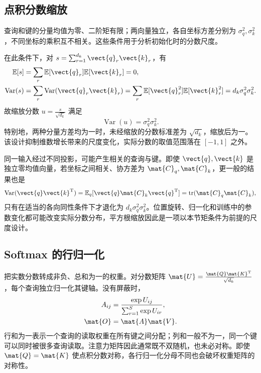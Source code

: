 \documentclass[../textbook.tex]{subfiles}
\begin{document}
\subsection{点积分数缩放}
\begin{assumption}[平方根缩放的矩条件]
查询和键的分量均值为零、二阶矩有限；两向量独立，各自坐标方差分别为 $\sigma_q^2,\sigma_k^2$，不同坐标的乘积互不相关。这些条件用于分析初始化时的分数尺度。
\end{assumption}
在此条件下，对 $s=\sum_{r=1}^{d_k}\vect{q}_r\vect{k}_r$，有
\begin{align}
 \mathbb E[s]&=\sum_r\mathbb E[\vect{q}_r]\mathbb E[\vect{k}_r]=0,\\
 \operatorname{Var}(s)
 &=\sum_r\operatorname{Var}(\vect{q}_r\vect{k}_r)
 =\sum_r\mathbb E[\vect{q}_r^2]\mathbb E[\vect{k}_r^2]
 =d_k\sigma_q^2\sigma_k^2.
\end{align}
故缩放分数 $u=\frac{s}{\sqrt{d_k}}$ 满足
\begin{equation}
 \operatorname{Var}(u)=\sigma_q^2\sigma_k^2.\label{eq:attn-scale}
\end{equation}
特别地，两种分量方差均为一时，未经缩放的分数标准差为 $\sqrt{d_k}$，缩放后为一。该设计抑制维数增长带来的尺度变化，实际分数的取值范围落在 $[-1,1]$ 之外。

同一输入经过不同投影，可能产生相关的查询与键。即使 $\vect{q},\vect{k}$ 是独立零均值向量，若坐标之间相关、协方差为 $\mat{C}_q,\mat{C}_k$，更一般的结果也是
\begin{equation}
 \operatorname{Var}(\vect{q}\vect{k}^{\mathrm{T}})
 =\mathbb E_q[\vect{q}\mat{C}_k\vect{q}^{\mathrm{T}}]
 =\operatorname{tr}(\mat{C}_q\mat{C}_k),
\end{equation}
只有在适当的各向同性条件下才退化为 $d_k\sigma_q^2\sigma_k^2$。位置旋转、归一化和训练中的参数变化都可能改变实际分数分布，平方根缩放因此是一项以本节矩条件为前提的尺度设计。

\subsection{Softmax 的行归一化}
把实数分数转成非负、总和为一的权重。对分数矩阵 $\mat{U}=\frac{\mat{Q}\mat{K}^{\mathrm{T}}}{\sqrt{d_k}}$，每个查询独立归一化其键轴。没有屏蔽时，
\begin{equation}\label{eq:attn-basic}
 \begin{aligned}
  A_{ij}&=\frac{\exp U_{ij}}{\sum_{r=1}^{S}\exp U_{ir}},\\
  \mat{O}&=\mat{A}\mat{V}.
 \end{aligned}
\end{equation}
行和为一表示一个查询的读取权重在所有键之间分配；列和一般不为一，同一个键可以同时被很多查询读取。注意力矩阵因此通常既不双随机，也未必对称。即使 $\mat{Q}=\mat{K}$ 使点积分数对称，各行归一化分母不同也会破坏权重矩阵的对称性。
\end{document}
